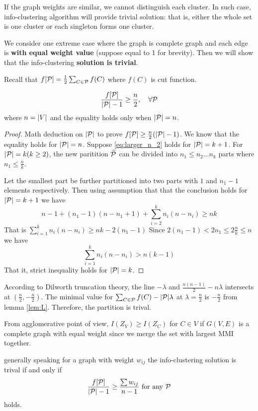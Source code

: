 \documentclass{article}
\begin{document}
If the graph weights are similar, we cannot distinguish each cluster. 
In such case, info-clustering algorithm will provide trivial solution: 
that is, either the whole set is one cluster or each singleton forms one cluster.

We consider one extreme case where the graph is complete graph and each edge is \textbf{with equal weight value} (suppose equal to 1 for brevity).
Then we will show that the info-clustering \textbf{solution is trivial}.

Recall that $f[\P] = \frac{1}{2}\sum_{C\in\P} f(C)$ where $f(C)$ is cut function.
\begin{lemma}\label{lem:L}
\begin{equation}\label{eq:larger_n_2}
\frac{f[\P]}{\abs{\P}-1} \geq \frac{n}{2}, \quad\forall \P
\end{equation}
where $n = \abs{V}$ and the equality holds only when $\abs{\P}=n$.
\end{lemma}
\begin{proof}
Math deduction on $\abs{\P}$ to prove $f[\P] \geq \frac{n}{2}(\abs{\P} - 1)$.  We know that the equality holds for $\abs{\P} = n$.
Suppose \eqref{eq:larger_n_2} holds for $\abs{\P} =k+1$. For $\abs{\P}=k(k\geq 2)$, the new paritition $\widetilde{\P}$ can be divided into $n_1\leq n_2 \dots n_k$ parts where $n_1 \leq \frac{n}{k}$.

Let the smallest part be further partitioned into two parts with $1$ and $n_1-1$ elements respectively.
Then using assumption that that the conclusion holds for $\abs{\P}=k+1$ we have
$$
n-1 + (n_1-1)(n-n_1+1) + \sum_{i=2}^k n_i(n-n_i) \geq nk
$$
That is $\sum_{i=1}^k n_i(n-n_i) \geq nk - 2(n_1-1)$
Since $2(n_1-1)<2n_1\leq 2\frac{n}{k} \leq n$ we have
$$
 \sum_{i=1}^k n_i(n-n_i)  > n(k-1)
$$
That it, strict inequality holds for $\abs{\P}=k$.
\end{proof}
According to Dilworth truncation theory, the line $-\lambda$ and $\frac{n(n-1)}{2} - n\lambda$ intersects at $(\frac{n}{2}, -\frac{n}{2})$. The minimal value for $\sum_{C\in\P}f(C) -\abs{\P}\lambda$ at $\lambda = \frac{n}{2}$ is $-\frac{n}{2}$ from lemma \ref{lem:L}. Therefore, the partition is trival.

From agglomerative point of view, $I(Z_V) \geq I(Z_C)$ for $C\in V$ if $G(V, E)$ is a complete graph with equal weight since we merge the set with largest MMI together.

generally speaking for a graph with weight $w_{ij}$ the info-clustering solution is trival if and only if
\begin{equation}\label{eq:GF}
\frac{f[\P]}{\abs{\P}-1} \geq \frac{\sum w_{ij}}{n-1} \textrm{ for any } \P
\end{equation}
holds.
\end{document}
